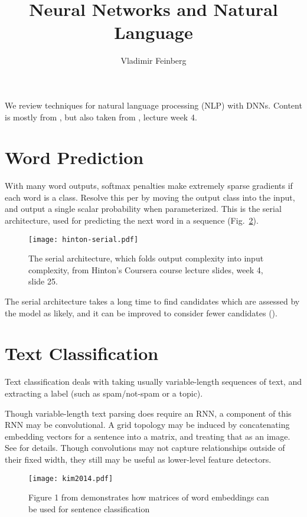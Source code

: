 \documentclass{article}
\title{Neural Networks and Natural Language}
\author{Vladimir Feinberg}
\begin{document}
\maketitle

We review techniques for natural language processing (NLP) with DNNs. Content is mostly from , but also taken from , lecture week 4.

\section{Word Prediction}

With many word outputs, softmax penalties make extremely sparse gradients if each word is a class. Resolve this per  by moving the output class into the input, and output a single scalar probability when parameterized. This is the serial architecture, used for predicting the next word in a sequence (Fig.~\ref{fig:serial}).
\begin{figure}[!h]
\centering
{\texttt{[image: hinton-serial.pdf]}}
  \caption{The serial architecture, which folds output complexity into input complexity, from Hinton's Coursera course lecture slides, week 4, slide 25.}
\label{fig:serial}
\end{figure}
The serial architecture takes a long time to find candidates which are assessed by the model as likely, and it can be improved to consider fewer candidates ().

\section{Text Classification}

Text classification deals with taking usually variable-length sequences of text, and extracting a label (such as spam/not-spam or a topic).

Though variable-length text parsing does require an RNN, a component of this RNN may be convolutional. A grid topology may be induced by concatenating embedding vectors for a sentence into a matrix, and treating that as an image. See  for details. Though convolutions may not capture relationships outside of their fixed width, they still may be useful as lower-level feature detectors.
\begin{figure}[!h]
\centering
{\texttt{[image: kim2014.pdf]}}
  \caption{Figure 1 from  demonstrates how matrices of word embeddings can be used for sentence classification}
\label{fig:serial}
\end{figure}
\end{document}

